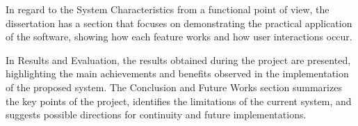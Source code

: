 In regard to the System Characteristics from a functional point of view, the dissertation has a section that focuses on demonstrating the practical application of the software, showing how each feature works and how user interactions occur.

In Results and Evaluation, the results obtained during the project are presented, highlighting the main achievements and benefits observed in the implementation of the proposed system. The Conclusion and Future Works section summarizes the key points of the project, identifies the limitations of the current system, and suggests possible directions for continuity and future implementations.
